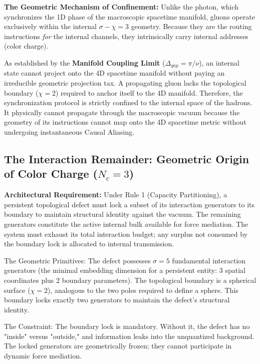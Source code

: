 \textbf{The Geometric Mechanism of Confinement:} 
Unlike the photon, which synchronizes the 1D phase of the macroscopic spacetime manifold, gluons operate exclusively within the internal $\sigma - \chi = 3$ geometry. Because they are the routing instructions \textit{for} the internal channels, they intrinsically carry internal addresses (color charge). 

As established by the \textbf{Manifold Coupling Limit} ($\Delta_{gap} = \pi/\nu$), an internal state cannot project onto the 4D spacetime manifold without paying an irreducible geometric projection tax. A propagating gluon lacks the topological boundary ($\chi=2$) required to anchor itself to the 4D manifold. Therefore, the synchronization protocol is strictly confined to the internal space of the hadrons. It physically cannot propagate through the macroscopic vacuum because the geometry of its instructions cannot map onto the 4D spacetime metric without undergoing instantaneous Causal Aliasing.




\subsection{The Interaction Remainder: Geometric Origin of Color Charge (\texorpdfstring{$N_c = 3$}{Nc = 3})}

\textbf{Architectural Requirement:} Under Rule 1 (Capacity Partitioning), a persistent topological defect must lock a subset of its interaction generators to its boundary to maintain structural identity against the vacuum. The remaining generators constitute the active internal bulk available for force mediation. The system must exhaust its total interaction budget; any surplus not consumed by the boundary lock is allocated to internal transmission.

The Geometric Primitives: The defect possesses $\sigma = 5$ fundamental interaction generators (the minimal embedding dimension for a persistent entity: 3 spatial coordinates plus 2 boundary parameters). The topological boundary is a spherical surface ($\chi = 2$), analogous to the two poles required to define a sphere. This boundary locks exactly two generators to maintain the defect's structural identity.

The Constraint: The boundary lock is mandatory. Without it, the defect has no "inside" versus "outside," and information leaks into the unquantized background. The locked generators are geometrically frozen; they cannot participate in dynamic force mediation.

